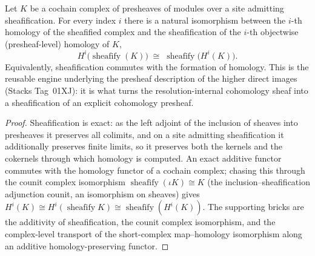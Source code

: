 \begin{lemma}
  \label{lem:cohomology_sheaf_is_sheafify_homology}
  Let \(K\) be a cochain complex of presheaves of modules over a site admitting
  sheafification. For every index \(i\) there is a natural
  isomorphism between the \(i\)-th homology of the sheafified complex and the
  sheafification of the \(i\)-th objectwise (presheaf-level) homology of \(K\),
  \[
    H^i\bigl(\operatorname{sheafify}(K)\bigr)
      \;\cong\;
    \operatorname{sheafify}\bigl(H^i(K)\bigr).
  \]
  Equivalently, sheafification commutes with the formation of homology. This is the
  reusable engine underlying the presheaf description of the higher direct images
  (Stacks Tag~01XJ): it is what turns the resolution-internal cohomology sheaf into a
  sheafification of an explicit cohomology presheaf.
\end{lemma}

\begin{proof}
  Sheafification is exact: as the left adjoint of the inclusion of sheaves into
  presheaves it preserves all colimits, and on a site admitting sheafification it
  additionally preserves finite limits, so it preserves both the kernels and the
  cokernels through which homology is computed. An exact additive functor commutes with
  the homology functor of a cochain complex; chasing this through the counit complex
  isomorphism \(\operatorname{sheafify}(\iota K) \cong K\) (the inclusion–sheafification
  adjunction counit, an isomorphism on sheaves) gives
  \(H^i(K) \cong H^i(\operatorname{sheafify} K) \cong
  \operatorname{sheafify}(H^i(K))\). The supporting bricks are the
  additivity of sheafification, the counit complex isomorphism, and the
  complex-level transport of the short-complex map–homology isomorphism along an
  additive homology-preserving functor.
\end{proof}


